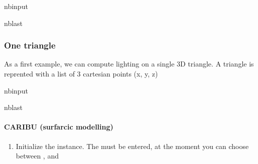 \documentclass[letterpaper,10pt,english]{sphinxmanual}
\begin{document}
\begin{sphinxuseclass}{nbinput}
\begin{sphinxuseclass}{nblast}
{
\begin{sphinxVerbatim}[commandchars=\\\{\}]
\llap{\color{nbsphinxin}[1]:\,\hspace{\fboxrule}\hspace{\fboxsep}}
   
   
\end{sphinxVerbatim}
}

\end{sphinxuseclass}
\end{sphinxuseclass}

\subsubsection{One triangle}
\label{\detokenize{tool_basics:One-triangle}}
\sphinxAtStartPar
As a first example, we can compute lighting on a single 3D triangle. A triangle is reprented with a list of 3 cartesian points (x, y, z)

\begin{sphinxuseclass}{nbinput}
\begin{sphinxuseclass}{nblast}
{
\begin{sphinxVerbatim}[commandchars=\\\{\}]
\llap{\color{nbsphinxin}[2]:\,\hspace{\fboxrule}\hspace{\fboxsep}}  \PYG{p}{[}        \PYG{p}{]}
\end{sphinxVerbatim}
}

\end{sphinxuseclass}
\end{sphinxuseclass}

\paragraph{CARIBU (surfarcic modelling)}
\label{\detokenize{tool_basics:CARIBU-(surfarcic-modelling)}}\begin{enumerate}
%
\item {} 
\sphinxAtStartPar
Initialize the instance. The  must be entered, at the moment you can choose between ,  and 

\end{enumerate}
\end{document}
